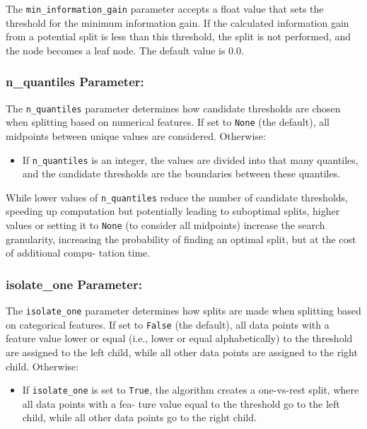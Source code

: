 \documentclass{article}
\begin{document}
The \texttt{min\_information\_gain} parameter accepts a float value that sets the threshold for the minimum information gain. If the calculated information gain from a potential split is less than this threshold, the split is not performed, and the node becomes a leaf node. The default value is 0.0.

\subsubsection*{n\_quantiles Parameter:}

The \texttt{n\_quantiles} parameter determines how candidate thresholds are chosen when splitting based on numerical features. If set to \texttt{None} (the default), all midpoints between unique values are considered. Otherwise:

\begin{itemize}
    \item If \texttt{n\_quantiles} is an integer, the values are divided into that many quantiles, and the candidate thresholds are the boundaries between these quantiles.
\end{itemize}

While lower values of \texttt{n\_quantiles} reduce the number of candidate thresholds, speeding up computation but potentially leading to suboptimal splits, higher values or setting it to \texttt{None} (to consider all midpoints) increase the search granularity, increasing the probability of finding an optimal split, but at the cost of additional compu- tation time.

\subsubsection*{isolate\_one Parameter:}

The \texttt{isolate\_one} parameter determines how splits are made when splitting based on categorical features. If set to \texttt{False} (the default), all data points with a feature value lower or equal (i.e., lower or equal alphabetically) to the threshold are assigned to the left child, while all other data points are assigned to the right child. Otherwise:

\begin{itemize}
\item If \texttt{isolate\_one} is set to \texttt{True}, the algorithm creates a one-vs-rest split, where all data points with a fea- ture value equal to the threshold go to the left child, while all other data points go to the right child.
\end{itemize}
\end{document}
